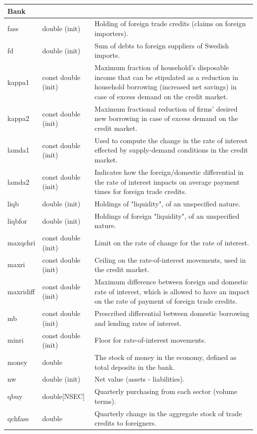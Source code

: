\documentclass{article}
\begin{document}
\begin{longtable}{p{}p{}p{}}
\multicolumn{3}{l}{\textbf{Bank}} \\
\midrule
fass & double (init) & Holding of foreign trade credits (claims on foreign importers).\\
fd & double (init) & Sum of debts to foreign suppliers of Swedish imports.\\
kappa1 & const double (init) & Maximum fraction of household's disposable income that can be stipulated as a reduction in household borrowing (increased net savings) in case of excess demand on the credit market.\\
kappa2 & const double (init) & Maximum fractional reduction of firms' desired new borrowing in case of excess demand on the credit market.\\
lamda1 & const double (init) & Used to compute the change in the rate of interest effected by supply-demand conditions in the credit market.\\
lamda2 & const double (init) & Indicates how the foreign/domestic differential in the rate of interest impacts on average payment times for foreign trade credits.\\
liqb & double (init) & Holdings of "liquidity", of an unspecified nature.\\
liqbfor & double (init) & Holdings of foreign "liquidity", of an unspecified nature.\\
maxqchri & const double (init) & Limit on the rate of change for the rate of interest.\\
maxri & const double (init) & Ceiling on the rate-of-interest movements, used in the credit market.\\
maxridiff & const double (init) & Maximum difference between foreign and domestic rate of interest, which is allowed to have an impact on the rate of payment of foreign trade credits.\\
mb & const double (init) & Prescribed differential between domestic borrowing and lending rates of interest.\\
minri & const double (init) & Floor for rate-of-interest movements.\\
money & double & The stock of money in the economy, defined as total deposits in the bank.\\
nw & double (init) & Net value (assets - liabilities).\\
qbuy & double[NSEC] & Quarterly purchasing from each sector (volume terms).\\
qchfass & double & Quarterly change in the aggregate stock of trade credits to foreigners.\\

\end{longtable}
\end{document}
